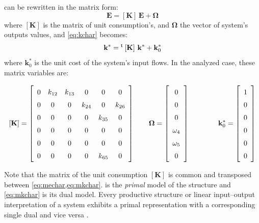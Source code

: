 \documentclass[energies,article,submit,moreauthors,pdftex]{Definitions/mdpi}
\newcommand{\vm}[1]{\ensuremath{\mathbf{#1}}}
\newcommand{\tm}{\ensuremath{\prescript{\smash{\mathsf{t}}}{}{\mskip1mu}}}
\begin{document}
 can be rewritten in the matrix form: 
\begin{equation}
    \vm{E}=\left[\vm{K}\right]\,\vm{E}+\vm{\Omega}
    \label{eq:mechar}
\end{equation}
where $\left[\vm{K}\right]$ is the matrix of unit consumption's, and $\vm{\Omega}$ the vector of system's outputs values, and \cref{eq:kchar} becomes:
\begin{equation}
    \vm{k}^* = \tm\left[\vm{K}\right]\,\vm{k}^* + \vm{k}_0^*
    \label{eq:mkchar}
\end{equation}
where $\vm{k}_0^*$ is the unit cost of the system's input flows. In the analyzed case, these matrix variables are:

\begin{equation*}
    \def\arraystretch{1.5}
    \left[\vm{K}\right]=\left[\begin{array}{cccccc}
    0 & k_{12} & k_{13} & 0 & 0 & 0 \\
    0 & 0 & 0 & k_{24} & 0 & k_{26} \\
    0 & 0 & 0 & 0 & k_{35} & 0 \\
    0 & 0 & 0 & 0 & 0 & 0 \\
    0 & 0 & 0 & 0 & 0 & 0 \\
    0 & 0 & 0 & 0 & k_{65} & 0
    \end{array}
    \right]
    \qquad
    \vm{\Omega}=\left[\begin{array}{c}
    0 \\
    0 \\
    0 \\
    \omega_4 \\
    \omega_5 \\
    0
    \end{array}
    \right]
    \qquad
    \qquad
    \vm{k}_0^*=\left[\begin{array}{c}
    1 \\
    0 \\
    0 \\
    0 \\
    0 \\
    0
    \end{array}
    \right]
\end{equation*}

Note that the matrix of the unit consumption $\left[\vm{K}\right]$ is common and transposed between \cref{eq:mechar,eq:mkchar}.  is the \emph{primal} model of the structure and \cref{eq:mkchar} is its dual model. Every productive structure or linear input–output interpretation of a system exhibits a primal representation with a corresponding single dual and vice versa \cite{Boyd2004}. 
\end{document}
